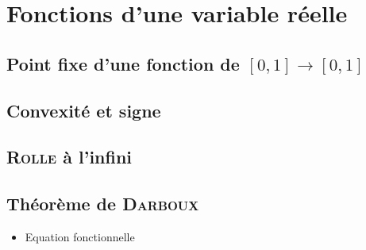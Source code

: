 \chapter{Fonctions d'une variable réelle}

\section{Point fixe d'une fonction de \texorpdfstring{$[0, 1] \rightarrow [0, 1]$}{[0, 1] dans [0, 1]}}


\section{Convexité et signe}


\section{\textsc{Rolle} à l'infini}


\section{Théorème de \textsc{Darboux}}


\begin{itemize}
    \item Equation fonctionnelle
\end{itemize}